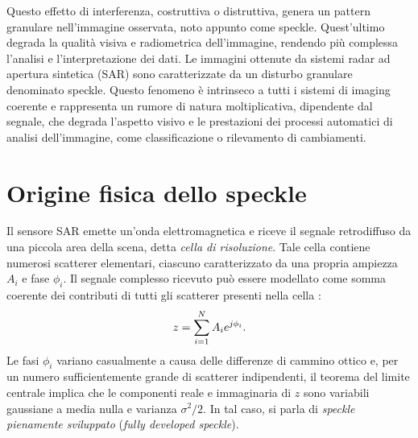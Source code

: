 Questo effetto di interferenza, costruttiva o distruttiva, genera un pattern granulare nell’immagine osservata, 
noto appunto come speckle. Quest'ultimo degrada la qualità visiva e radiometrica dell’immagine, rendendo più complessa l’analisi e l’interpretazione dei dati.
Le immagini ottenute da sistemi radar ad apertura sintetica (SAR) sono caratterizzate da un disturbo granulare denominato speckle.  
Questo fenomeno è intrinseco a tutti i sistemi di imaging coerente e rappresenta un rumore di natura moltiplicativa, dipendente dal segnale, che degrada l’aspetto visivo e le prestazioni dei processi automatici di analisi dell’immagine, come classificazione o rilevamento di cambiamenti.
\section{Origine fisica dello speckle}
Il sensore SAR emette un’onda elettromagnetica e riceve il segnale retrodiffuso da una piccola area della scena, detta \emph{cella di risoluzione}.  
Tale cella contiene numerosi scatterer elementari, ciascuno caratterizzato da una propria ampiezza $A_i$ e fase $\phi_i$.  
Il segnale complesso ricevuto può essere modellato come somma coerente dei contributi di tutti gli scatterer presenti nella cella \cite{6616053}:
\begin{equation}
  \makebox[\textwidth][c]{%
    $\displaystyle
      z = \sum_{i=1}^{N} A_i e^{j \phi_i}.
    $%
  }
\end{equation}
Le fasi $\phi_i$ variano casualmente a causa delle differenze di cammino ottico e, per un numero sufficientemente grande di scatterer indipendenti, il teorema del limite centrale implica che le componenti reale e immaginaria di $z$ sono variabili gaussiane a media nulla e varianza $\sigma^2 / 2$.  
In tal caso, si parla di \emph{speckle pienamente sviluppato} (\emph{fully developed speckle}).
